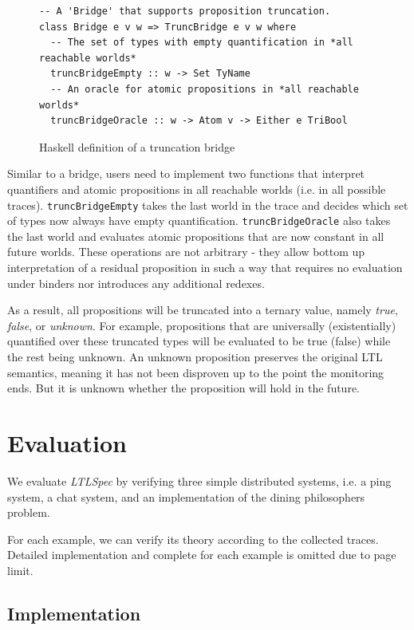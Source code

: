 \documentclass[format=acmsmall, nonacm=true, review=true, screen=true]{acmart}
\newcommand{\mycaption}[1]{\Description{#1}\caption{#1}}
\newcommand{\ltlspec}{\textit{LTLSpec}\xspace}
\begin{document}
\begin{figure}[h]
  {
    \fontsize{10}{12}\selectfont
    \begin{verbatim}
-- A 'Bridge' that supports proposition truncation.
class Bridge e v w => TruncBridge e v w where
  -- The set of types with empty quantification in *all reachable worlds*
  truncBridgeEmpty :: w -> Set TyName
  -- An oracle for atomic propositions in *all reachable worlds*
  truncBridgeOracle :: w -> Atom v -> Either e TriBool
\end{verbatim}
  }
  \mycaption{Haskell definition of a truncation bridge}
  \label{fig:truncation-sig}
\end{figure}

Similar to a bridge, users need to implement two functions that interpret quantifiers and atomic propositions in all reachable worlds (i.e. in all possible traces).
\texttt{truncBridgeEmpty} takes the last world in the trace and decides which set of types now always have empty quantification.
\texttt{truncBridgeOracle} also takes the last world and evaluates atomic propositions that are now constant in all future worlds.
These operations are not arbitrary - they allow bottom up interpretation of a residual proposition in such a way that requires no evaluation under binders nor introduces any additional redexes.

As a result, all propositions will be truncated into a ternary value, namely \textit{true}, \textit{false}, or \textit{unknown}.
For example, propositions that are universally (existentially) quantified over these truncated types will be evaluated to be true (false) while the rest being unknown.
An unknown proposition preserves the original LTL semantics, meaning it has not been disproven up to the point the monitoring ends. But it is unknown whether the proposition will hold in the future.

\section{Evaluation}

We evaluate \ltlspec by verifying three simple distributed systems, i.e. a ping system, a chat system, and an implementation of the dining philosophers problem.

For each example, we can verify its theory according to the collected traces. Detailed implementation and complete for each example is omitted due to page limit.

\subsection{Implementation}
\end{document}
